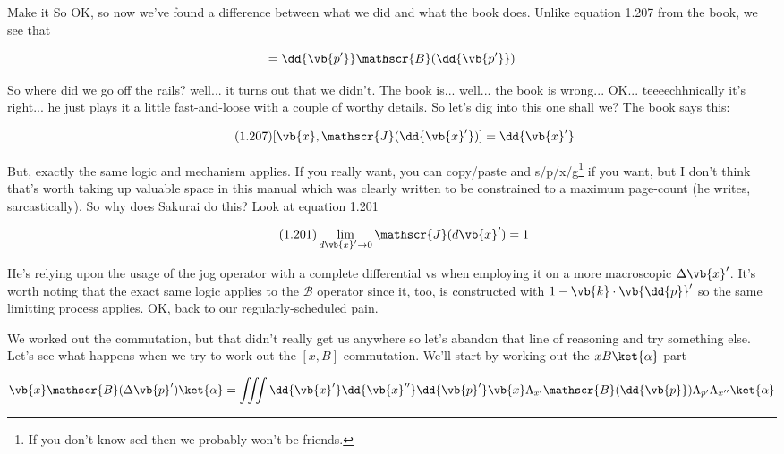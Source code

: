 \begin{answer}
\begin{answerpart}{Make it So}
    OK, so now we've found a difference between what we did and what
    the book does.  Unlike equation 1.207 from the book, we see that

    \begin{equation}
      [\vb{p}, \mathscr{B}(\dd{\vb{p'}})] =
      \dd{\vb{p'}}\mathscr{B}(\dd{\vb{p'}})
    \end{equation}

    So where did we go off the rails?  well... it turns out that we
    didn't.  The book is... well... the book is
    wrong... OK... teeeechhnically it's right... he just plays it a
    little fast-and-loose with a couple of worthy details.  So let's
    dig into this one shall we?  The book says this:

    \begin{equation}
      \tag{1.207}
      [\vb{x}, \mathscr{J}(\dd{\vb{x}'})] = \dd{\vb{x}'}
    \end{equation}

    But, exactly the same logic and mechanism applies.  If you really
    want, you can copy/paste and s/p/x/g\footnote{If you don't know
    sed then we probably won't be friends.} if you want, but I don't
    think that's worth taking up valuable space in this manual which
    was clearly written to be constrained to a maximum page-count (he
    writes, sarcastically).  So why does Sakurai do this?  Look at
    equation 1.201

    \begin{equation}
      \tag{1.201}
      \lim_{d\vb{x}' \rightarrow 0}\mathscr{J}(d\vb{x}') = 1
    \end{equation}

    He's relying upon the usage of the jog operator with a complete
    differential vs when employing it on a more macroscopic $\Delta
    \vb{x}'$.  It's worth noting that the exact same logic applies to
    the $\mathscr{B}$ operator since it, too, is constructed with $1 -
    \vb{k}\cdot\vb{\dd{p}}'$ so the same limitting process applies.
    OK, back to our regularly-scheduled pain.

    We worked out the commutation, but that didn't really get us
    anywhere so let's abandon that line of reasoning and try something
    else.  Let's see what happens when we try to work out the $[x,B]$
    commutation.  We'll start by working out the $xB\ket{\alpha}$
    part

    \begin{equation}
      \begin{alignedat}{2}
        && \vb{x}\mathscr{B}(\Delta \vb{p}')\ket{\alpha}
        &=
        \iiint \dd{\vb{x}'} \dd{\vb{x}''} \dd{\vb{p}'}
        \vb{x}
        \Lambda_{x'}
        \mathscr{B}(\dd{\vb{p}}) \Lambda_{p'}
        \Lambda_{x''}
        \ket{\alpha}
        \\
      \end{alignedat}
    \end{equation}


\end{answerpart}
\end{answer}
